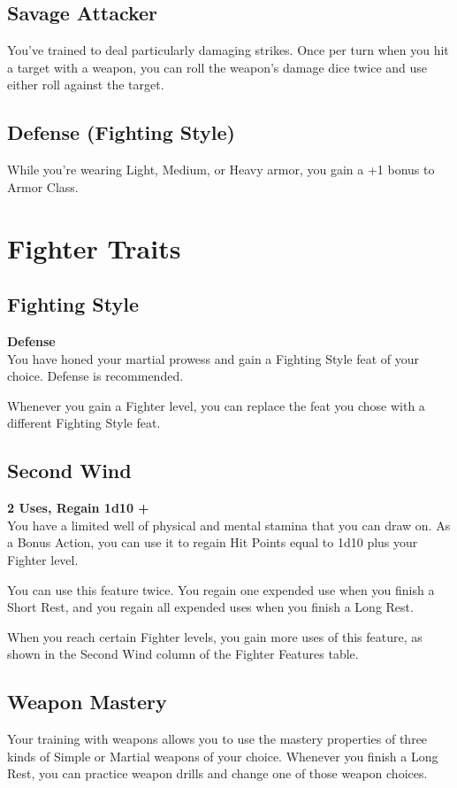 \documentclass[letterpaper,openany,oneside,twocolumn]{book}
\begin{document}
\subsection*{Savage Attacker}
You've trained to deal particularly damaging strikes. Once per turn when you hit a target with a weapon, you can roll the weapon's damage dice twice and use either roll against the target.
\subsection*{Defense (Fighting Style)}
While you're wearing Light, Medium, or Heavy armor, you gain a +1 bonus to Armor Class.

\section*{Fighter Traits}
\subsection*{Fighting Style}
\textbf{Defense}\\
You have honed your martial prowess and gain a Fighting Style feat of your choice. Defense is recommended.

Whenever you gain a Fighter level, you can replace the feat you chose with a different Fighting Style feat.
\subsection*{Second Wind}
\textbf{2 Uses, Regain 1d10 + }\\
You have a limited well of physical and mental stamina that you can draw on. As a Bonus Action, you can use it to regain Hit Points equal to 1d10 plus your Fighter level.

You can use this feature twice. You regain one expended use when you finish a Short Rest, and you regain all expended uses when you finish a Long Rest.

When you reach certain Fighter levels, you gain more uses of this feature, as shown in the Second Wind column of the Fighter Features table.
\subsection*{Weapon Mastery}
Your training with weapons allows you to use the mastery properties of three kinds of Simple or Martial weapons of your choice. Whenever you finish a Long Rest, you can practice weapon drills and change one of those weapon choices.
\end{document}
